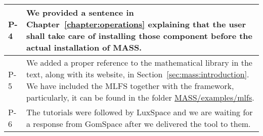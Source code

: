 \begin{longtable}{|p{1.5cm}|p{12cm}|@{}}
P-4&
\begin{minipage}{12cm}
We provided a sentence in Chapter~\ref{chapter:operations} explaining that the user shall take care of installing those component before the actual installation of MASS.
\end{minipage}\\
\hline

P-5&
\begin{minipage}{12cm}
We added a proper reference to the mathematical library in the text, along with its website, in Section~\ref{sec:mass:introduction}.
We have included the MLFS together with the framework, particularly, it can be found in the folder \url{MASS/examples/mlfs}.
\end{minipage}\\
\hline

P-6&
\begin{minipage}{12cm}
The tutorials were followed by LuxSpace and we are waiting for a response from GomSpace after we delivered the tool to them.
\end{minipage}\\
\hline



\end{longtable}
\normalsize

\clearpage
